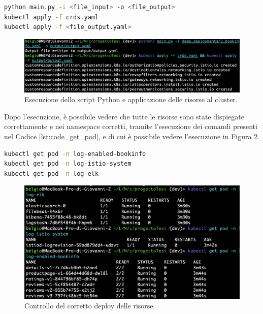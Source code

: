 \begin{lstlisting}[caption={Comandi per l'applicazione dei CRD e del deployment modificato.}, label=lst:code_run_script, language=bash]
python main.py -i <file_input> -o <file_output>
kubectl apply -f crds.yaml
kubectl apply -f <file_output.yaml>
\end{lstlisting}
\begin{figure}[H]
    \centering
    \includegraphics[width=\textwidth]{immagini/capitolo5/run_script.png}
    \caption{Esecuzione dello script Python e applicazione delle risorse al cluster.}
    \label{fig:run_script}
\end{figure}

Dopo l'esecuzione, è possibile vedere che tutte le risorse sono state dispiegate correttamente e nei namespace corretti, tramite l'esecuzione dei comandi presenti nel Codice \ref{lst:code_get_pod}, e di cui è possibile vedere l'esecuzione in Figura \ref{fig:kubectl_get_pod}.
\begin{lstlisting}[caption={Comandi per l'applicazione dei CRD e del deployment modificato.},label=lst:code_get_pod,language=bash]
kubectl get pod -n log-enabled-bookinfo
kubectl get pod -n log-istio-system
kubectl get pod -n log-elk
\end{lstlisting}
\begin{figure}[h]
    \centering
    \includegraphics[width=\textwidth]{immagini/capitolo5/kubectl_get_pod.png}
    \caption{Controllo del corretto deploy delle risorse.}
    \label{fig:kubectl_get_pod}
\end{figure}

